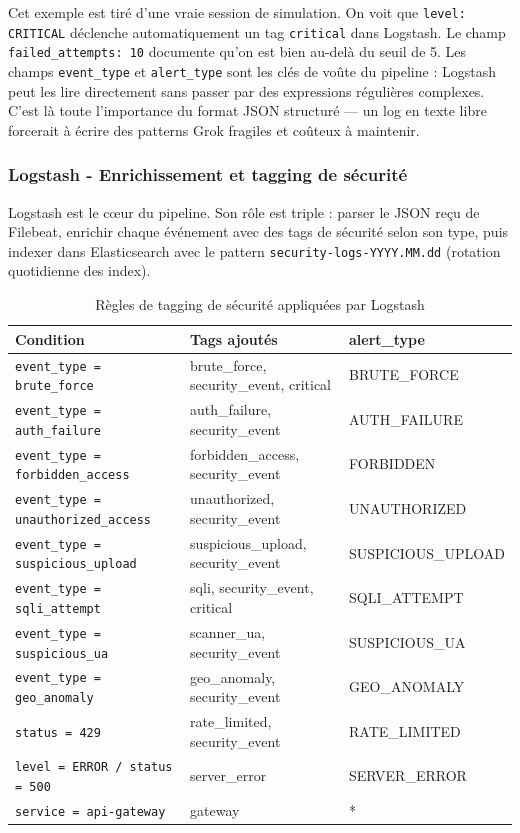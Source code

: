 \documentclass[12pt, a4paper]{report}
\begin{document}
\medskip
Cet exemple est tiré d'une vraie session de simulation. On voit que \texttt{level: CRITICAL} déclenche automatiquement un tag \texttt{critical} dans Logstash. Le champ \texttt{failed\_attempts: 10} documente qu'on est bien au-delà du seuil de 5. Les champs \texttt{event\_type} et \texttt{alert\_type} sont les clés de voûte du pipeline : Logstash peut les lire directement sans passer par des expressions régulières complexes. C'est là toute l'importance du format JSON structuré — un log en texte libre forcerait à écrire des patterns Grok fragiles et coûteux à maintenir.

\subsubsection{Logstash - Enrichissement et tagging de sécurité}

Logstash est le cœur du pipeline. Son rôle est triple : parser le JSON reçu de Filebeat, enrichir chaque événement avec des tags de sécurité selon son type, puis indexer dans Elasticsearch avec le pattern \texttt{security-logs-YYYY.MM.dd} (rotation quotidienne des index).

\begin{table}[H]
  \centering
  \caption{Règles de tagging de sécurité appliquées par Logstash}
  \begin{tabularx}{\textwidth}{@{}llX@{}}
    \toprule
    \textbf{Condition} & \textbf{Tags ajoutés} & \textbf{alert\_type} \\
    \midrule
    \texttt{event\_type = brute\_force}          & brute\_force, security\_event, critical  & BRUTE\_FORCE \\
    \texttt{event\_type = auth\_failure}          & auth\_failure, security\_event           & AUTH\_FAILURE \\
    \texttt{event\_type = forbidden\_access}      & forbidden\_access, security\_event       & FORBIDDEN \\
    \texttt{event\_type = unauthorized\_access}   & unauthorized, security\_event            & UNAUTHORIZED \\
    \texttt{event\_type = suspicious\_upload}     & suspicious\_upload, security\_event      & SUSPICIOUS\_UPLOAD \\
    \texttt{event\_type = sqli\_attempt}          & sqli, security\_event, critical          & SQLI\_ATTEMPT \\
    \texttt{event\_type = suspicious\_ua}         & scanner\_ua, security\_event             & SUSPICIOUS\_UA \\
    \texttt{event\_type = geo\_anomaly}           & geo\_anomaly, security\_event            & GEO\_ANOMALY \\
    \texttt{status = 429}                         & rate\_limited, security\_event           & RATE\_LIMITED \\
    \texttt{level = ERROR / status = 500}         & server\_error                            & SERVER\_ERROR \\
    \texttt{service = api-gateway}                & gateway                                  & * \\
    \bottomrule
  \end{tabularx}
\end{table}
\end{document}
